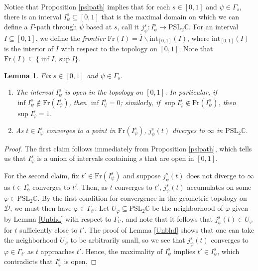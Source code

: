 \documentclass[11pt,leqno]{article}
\newtheorem{lemma}{Lemma}
\theoremstyle{introdef}
\numberwithin{lemma}{section}
\theoremstyle{definition}
\newcommand{\C}{\mathbb{C}}
\begin{document}
Notice that Proposition \ref{pslpath} implies that for each $s\in[0,1]$ and $\psi\in\Gamma_s$, there is an interval $I_\psi^s\subseteq[0,1]$ that is the maximal domain on which we can define a $\Gamma$-path through $\psi$ based at $s$, call it $j_\psi^s:I_\psi^s\rightarrow\mathrm{PSL}_2\C$. For an interval $I\subseteq[0,1]$, we define the \textit{frontier} $\mathrm{Fr}(I)=\overline{I}\backslash\mathrm{int}_{[0,1]}(I)$, where $\mathrm{int}_{[0,1]}(I)$ is the interior of $I$ with respect to the topology on $[0,1]$. Note that $\mathrm{Fr}(I)\subseteq\{\inf I, \sup I\}$.

\begin{lemma}
    \label{Lemma-j-path-props}
    Fix $s\in[0,1]$ and $\psi\in\Gamma_s$.
    \begin{enumerate}
        \item The interval $I_\psi^s$ is open in the topology on $[0,1]$. In particular, if $\inf I_\psi^s\not\in\mathrm{Fr}(I_\psi^s)$, then $\inf I_\psi^s=0$; similarly, if $\sup I_\psi^s\not\in\mathrm{Fr}(I_\psi^s)$, then $\sup I_\psi^s=1$.
        \item As $t\in I_\psi^s$ converges to a point in $\mathrm{Fr}(I_\psi^s)$, $j_\psi^s(t)$ diverges to $\infty$ in $\mathrm{PSL}_2\C$.
    \end{enumerate}
\end{lemma}

\begin{proof}
    The first claim follows immediately from Proposition \ref{pslpath}, which tells us that $I_\psi^s$ is a union of intervals containing $s$ that are open in $[0,1]$.\par
    
    For the second claim, fix $t'\in\mathrm{Fr}(I_\psi^s)$ and suppose $j_\psi^s(t)$ does not diverge to $\infty$ as $t\in I_\psi^s$ converges to $t'$. Then, as $t$ converges to $t'$, $j_\psi^s(t)$ accumulates on some $\varphi\in\mathrm{PSL}_2\C$. By the first condition for convergence in the geometric topology on $\mathcal{D}$, we must then have $\varphi\in\Gamma_{t'}$. Let $U_\varphi\subseteq\mathrm{PSL}_2\C$ be the neighborhood of $\varphi$ given by Lemma \ref{Unbhd} with respect to $\Gamma_{t'}$, and note that it follows that $j_\psi^s(t)\in U_\varphi$ for $t$ sufficiently close to $t'$. The proof of Lemma \ref{Unbhd} shows that one can take the neighborhood $U_\varphi$ to be arbitrarily small, so we see that $j_\psi^s(t)$ converges to $\varphi\in\Gamma_{t'}$ as $t$ approaches $t'$. Hence, the maximality of $I_\psi^s$ implies $t'\in I_\psi^s$, which contradicts that $I_\psi^s$ is open.
\end{proof}
\end{document}

